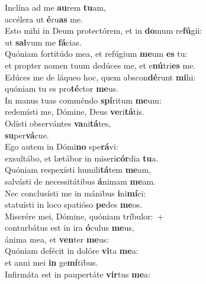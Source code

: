 \evenverse Inclína ad me \textbf{au}rem \textbf{tu}am,~\*\\
\evenverse accélera ut \textbf{é}ru\textbf{as} me.\\
\oddverse Esto mihi in Deum protectórem, et in \textbf{do}mum re\textbf{fú}gii:~\*\\
\oddverse ut \textbf{sal}vum me \textbf{fá}cias.\\
\evenverse Quóniam fortitúdo mea, et refúgium \textbf{me}um \textbf{es} tu:~\*\\
\evenverse et propter nomen tuum dedúces me, et e\textbf{nú}tri\textbf{es} me.\\
\oddverse Edúces me de láqueo hoc, quem abscon\textbf{dé}runt \textbf{mi}hi:~\*\\
\oddverse quóniam tu es pro\textbf{té}ctor \textbf{me}us.\\
\evenverse In manus tuas comméndo \textbf{spí}ritum \textbf{me}um:~\*\\
\evenverse redemísti me, Dómine, Deus \textbf{ve}ri\textbf{tá}tis.\\
\oddverse Odísti observántes \textbf{va}ni\textbf{tá}tes,~\*\\
\oddverse \textbf{su}per\textbf{vá}cue.\\
\evenverse Ego autem in Dómi\textbf{no} spe\textbf{rá}vi:~\*\\
\evenverse exsultábo, et lætábor in miseri\textbf{cór}dia \textbf{tu}a.\\
\oddverse Quóniam respexísti humili\textbf{tá}tem \textbf{me}am,~\*\\
\oddverse salvásti de necessitátibus \textbf{á}nimam \textbf{me}am.\\
\evenverse Nec conclusísti me in mánibus \textbf{i}ni\textbf{mí}ci:~\*\\
\evenverse statuísti in loco spatióso \textbf{pe}des \textbf{me}os.\\
\oddverse Miserére mei, Dómine, quóniam tríbulor:~+\\
\oddverse  conturbátus est in ira \textbf{ó}culus \textbf{me}us,~\*\\
\oddverse ánima mea, et \textbf{ven}ter \textbf{me}us:\\
\evenverse Quóniam defécit in dolóre \textbf{vi}ta \textbf{me}a:~\*\\
\evenverse et anni mei \textbf{in} ge\textbf{mí}tibus.\\
\oddverse Infirmáta est in paupertáte \textbf{vir}tus \textbf{me}a:~\*\\
